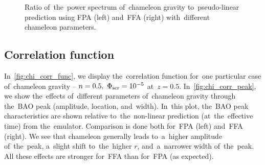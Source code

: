 \begin{figure*}[!tb]
  \centering
	\begin{subfigure}{1.2\textwidth}
		\chileft
	\end{subfigure}
	\begin{subfigure}{0.5\textwidth}
	\end{subfigure}%
	\begin{subfigure}{0.5\textwidth}
	\end{subfigure}
  \caption{Ratio of~the~power spectrum of~chameleon gravity to~pseudo-linear prediction using FPA (left) and~FFA (right) with~different chameleon parameters.}
  \label{fig:CHI_FP_diff_lin_ratio}
\end{figure*}


\subsection{Correlation function}
In~\autoref{fig:chi_corr_func}, we display the~correlation function for~one particular case of~chameleon gravity -- $n=0.5,\ \Phi_{\text{\scriptsize scr}}=10^{-5}$ at~$z=0.5$. In~\autoref{fig:chi_corr_peak}, we show the~effects of~different parameters of~chameleon gravity through the~BAO peak (amplitude, location, and~width). In~this plot, the~BAO peak characteristics are shown relative to~the~non-linear prediction (at~the~effective time) from the~emulator. Comparison is done both for~FPA (left) and~FFA (right). We see that chameleon generally leads to~a~higher amplitude of~the~peak, a~slight shift to~the~higher $r$, and~a~narrower width of~the~peak. All these effects are stronger for~FFA than for~FPA (as expected).

